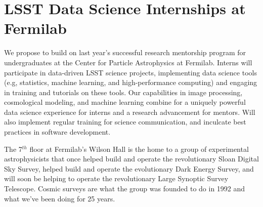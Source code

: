 
\section{LSST Data Science Internships at Fermilab}


 
We propose to build on last year's successful research mentorship program for undergraduates at the Center for Particle Astrophysics at Fermilab.
Interns will participate in data-driven LSST science projects, implementing data science tools (e.g, statistics, machine learning, and high-performance computing) and engaging in training and tutorials on these tools.
Our capabilities in image processing, cosmological modeling, and machine learning combine for a uniquely powerful
data science experience for interns and a research advancement for mentors.
Will also implement regular training for science communication, and inculcate best practices in software development.


The 7$^{th}$ floor at Fermilab's Wilson Hall is the home to a 
group of experimental astrophysicists that once helped build and operate
the revolutionary Sloan Digital Sky Survey, helped build and operate
the evolutionary Dark Energy Survey, and will soon be helping to operate 
the revolutionary Large Synoptic Survey Telescope. Cosmic surveys are
what the group was founded to do in 1992 and what we've been doing for 25 years.


